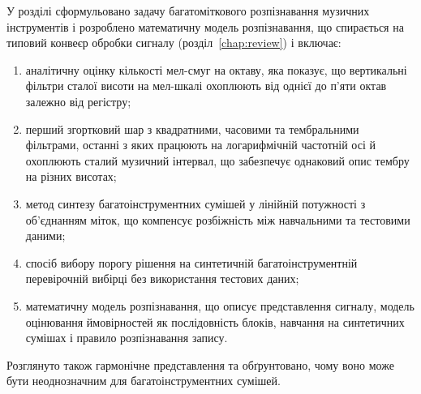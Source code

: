 У розділі сформульовано задачу багатоміткового розпізнавання музичних
інструментів і розроблено математичну модель розпізнавання, що спирається на
типовий конвеєр обробки сигналу (розділ~\ref{chap:review}) і включає:
\begin{enumerate}
    \item аналітичну оцінку кількості мел-смуг на октаву, яка показує, що
    вертикальні фільтри сталої висоти на мел-шкалі охоплюють від однієї до
    п'яти октав залежно від регістру;
    \item перший згортковий шар з квадратними, часовими та тембральними
    фільтрами, останні з яких працюють на логарифмічній частотній осі й
    охоплюють сталий музичний інтервал, що забезпечує однаковий опис тембру
    на різних висотах;
    \item метод синтезу багатоінструментних сумішей у лінійній потужності з
    об'єднанням міток, що компенсує розбіжність між навчальними та
    тестовими даними;
    \item спосіб вибору порогу рішення на синтетичній багатоінструментній
    перевірочній вибірці без використання тестових даних;
    \item математичну модель розпізнавання, що описує представлення сигналу,
    модель оцінювання ймовірностей як послідовність блоків, навчання на
    синтетичних сумішах і правило розпізнавання запису.
\end{enumerate}
Розглянуто також гармонічне представлення та обґрунтовано, чому воно
може бути неоднозначним для багатоінструментних сумішей.
